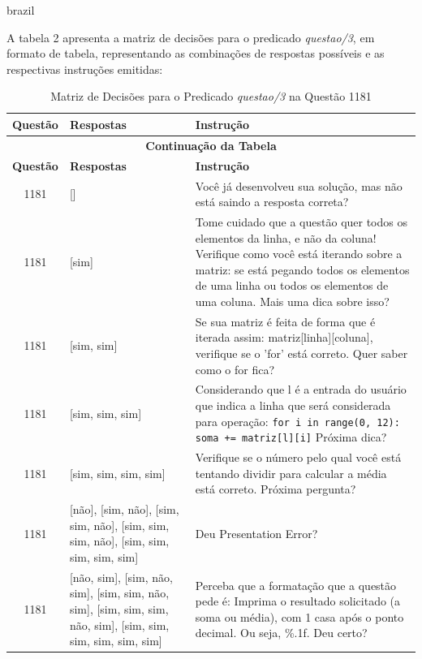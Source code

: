 \begin{otherlanguage*}{brazil}
\begin{itemize}
    A tabela 2 apresenta a matriz de decisões para o predicado \textit{questao/3}, em formato de tabela, representando as combinações de respostas possíveis e as respectivas instruções emitidas:

    \begin{longtable}{|c|p{5cm}|p{8cm}|}
        \caption{Matriz de Decisões para o Predicado \textit{questao/3} na Questão 1181} \\
        \hline
        \textbf{Questão} & \textbf{Respostas} & \textbf{Instrução} \\
        \hline
        \endfirsthead
        \multicolumn{3}{|c|}{\textbf{Continuação da Tabela}} \\
        \hline
        \textbf{Questão} & \textbf{Respostas} & \textbf{Instrução} \\
        \hline
        \endhead
        \hline
        \endfoot
        \hline
        \endlastfoot
        
        1181 & [] & Você já desenvolveu sua solução, mas não está saindo a resposta correta? \\
        \hline
        1181 & [sim] & Tome cuidado que a questão quer todos os elementos da linha, e não da coluna! Verifique como você está iterando sobre a matriz: se está pegando todos os elementos de uma linha ou todos os elementos de uma coluna. Mais uma dica sobre isso? \\
        \hline
        1181 & [sim, sim] & Se sua matriz é feita de forma que é iterada assim: matriz[linha][coluna], verifique se o 'for' está correto. Quer saber como o for fica? \\
        \hline
        1181 & [sim, sim, sim] & Considerando que l é a entrada do usuário que indica a linha que será considerada para operação: \texttt{for i in range(0, 12): soma += matriz[l][i]} \newline Próxima dica? \\
        \hline
        1181 & [sim, sim, sim, sim] & Verifique se o número pelo qual você está tentando dividir para calcular a média está correto. Próxima pergunta? \\
        \hline
        1181 & [não], [sim, não], [sim, sim, não], [sim, sim, sim, não], [sim, sim, sim, sim, sim] & Deu Presentation Error? \\
        \hline
        1181 & [não, sim], [sim, não, sim], [sim, sim, não, sim], [sim, sim, sim, não, sim], [sim, sim, sim, sim, sim, sim] & Perceba que a formatação que a questão pede é: Imprima o resultado solicitado (a soma ou média), com 1 casa após o ponto decimal. Ou seja, \%.1f. Deu certo? \\
      \end{longtable}
    

\end{itemize}
\end{otherlanguage*}
